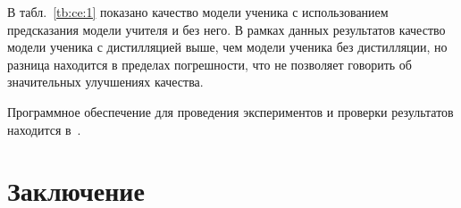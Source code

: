 \documentclass[12pt]{a&t}
\begin{document}
В табл.~\ref{tb:ce:1} показано качество модели ученика с использованием предсказания модели учителя и без него. В рамках данных результатов качество модели ученика с дистилляцией выше, чем модели ученика без дистилляции, но разница находится в пределах погрешности, что не позволяет говорить об значительных улучшениях качества.

Программное обеспечение для проведения экспериментов и проверки результатов находится в~\cite{Code2020}.

\section{Заключение}
\begin{table}[]
\caption{Сводная таблица результатов вычислительного эксперимента.}
\label{tb:ce:1}
\begin{center}
\end{center}
\end{table}
\end{document}
